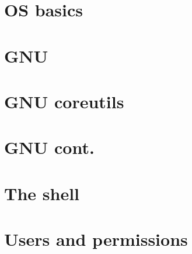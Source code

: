 \documentclass[oneside]{book}
\begin{document}
\part{OS basics}




\part{GNU}





\part{GNU coreutils}




\part{GNU cont.}






\part{The shell}



\part{Users and permissions}
%
%
\end{document}
